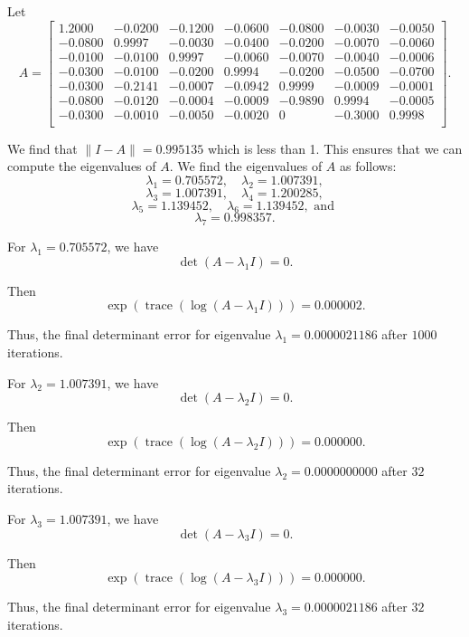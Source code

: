 \begin{example}


Let
\[A = 
\begin{bmatrix}
1.2000 & -0.0200 & -0.1200 & -0.0600 & -0.0800 & -0.0030 & -0.0050 \\
-0.0800 & 0.9997 & -0.0030 & -0.0400 & -0.0200 & -0.0070 & -0.0060 \\
-0.0100 & -0.0100 & 0.9997 & -0.0060 & -0.0070 & -0.0040 & -0.0006 \\
-0.0300 & -0.0100 & -0.0200 & 0.9994 & -0.0200 & -0.0500 & -0.0700 \\
-0.0300 & -0.2141 & -0.0007 & -0.0942 & 0.9999 & -0.0009 & -0.0001 \\
-0.0800 & -0.0120 & -0.0004 & -0.0009 & -0.9890 & 0.9994 & -0.0005 \\
-0.0300 & -0.0010 & -0.0050 & -0.0020 & 0 & -0.3000 & 0.9998 \\
\end{bmatrix}.
\]

We find that $\|I-A\| = 0.995135$ which is less than 1. This ensures that we can compute the eigenvalues of $A$. We find the eigenvalues of $A$ as follows: 
 $$ \lambda_1 = 0.705572, \quad \lambda_2 = 1.007391, $$
 $$ \lambda_3 = 1.007391, \quad \lambda_4 = 1.200285, $$
 $$ \lambda_5 = 1.139452, \quad \lambda_6 = 1.139452, \text{ and }$$
 $$ \lambda_7 = 0.998357.$$

For $ \lambda_1 = 0.705572 $, we have 
   $$\det(A - \lambda_1 I)= 0.$$

Then $$\exp(\operatorname{trace}(\log (A -\lambda_1 I ))) = 0.000002.$$

Thus, the final determinant error for eigenvalue $\lambda_1 = 0.0000021186$ after $1000$ iterations.

For $\lambda_2 = 1.007391$, we have $$\det(A - \lambda_2 I)= 0.$$

Then
$$\exp(\operatorname{trace}(\log (A -\lambda_2 I )))= 0.000000.$$ 

Thus, the final determinant error for eigenvalue $\lambda_2 = 0.0000000000$ after $32$ iterations.

For $ \lambda_3 = 1.007391 $, we have 
   $$\det(A - \lambda_3 I)= 0.$$

Then $$\exp(\operatorname{trace}(\log (A -\lambda_3 I ))) = 0.000000.$$

Thus, the final determinant error for eigenvalue $\lambda_3 = 0.0000021186$ after $32$ iterations.


\end{example}

